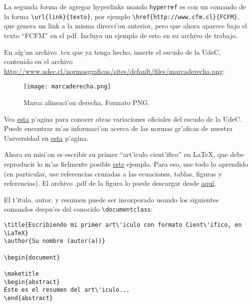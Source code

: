 \documentclass[11pt]{exam}
\begin{document}
\begin{questions}
\item La segunda forma de agregar hyperlinks usando \texttt{hyperref} es con un comando de la forma \verb|\url{link}{texto}|, por ejemplo \verb|\href{http://www.cfm.cl}{FCFM}|, que genera un link a la misma direcci'on anterior, pero que ahora aparece bajo el texto ``FCFM'' en el pdf. Incluya un ejemplo de esto en su archivo de trabajo.

\item En alg'un archivo .tex que ya tenga hecho, inserte el escudo de la UdeC, contenido en el archivo \url{http://www.udec.cl/normasgraficas/sites/default/files/marcaderecha.png}:
\begin{figure}[h!]
\begin{center}
\texttt{[image: marcaderecha.png]}
\end{center}
\caption{Marca alineaci'on derecha, Formato PNG.}
\label{fig:escudo}
\end{figure}

Vea \href{http://www.udec.cl/normasgraficas/node/4}{esta} p'agina para conocer otras variaciones oficiales del escudo de la UdeC. 
Puede encontrar m'as informaci'on acerca de las normas gr'aficas de nuestra Universidad en \href{http://www.udec.cl/normasgraficas}{esta} p'agina.

\item Ahora su misi'on es escribir su primer ``art'iculo cient'ifico'' en \LaTeX, que debe reproducir lo m'as fielmente posible \href{https://github.com/gfrubi/CC/blob/master/guias/06/ejemplo-articulo.pdf}{este} ejemplo. Para eso, use todo lo aprendido (en particular, use referencias cruzadas a las ecuaciones, tablas, figuras y referencias). El archivo .pdf de la figura lo puede descargar desde \href{https://github.com/gfrubi/CC/blob/master/guias/05/fig-ajuste-lineal.pdf}{aqu\'i}.

El t'itulo, autor, y resumen puede ser incorporado usando los siguientes comandos despu'es del conocido \verb|\documentclass|:

\begin{verbatim}
\title{Escribiendo mi primer art\'iculo con formato Cient\'ifico, en \LaTeX}
\author{Su nombre (autor(a))}

\begin{document}

\maketitle
\begin{abstract}
Este es el resumen del art\'iculo...
\end{abstract}
\end{verbatim}



\end{questions}
\end{document}

